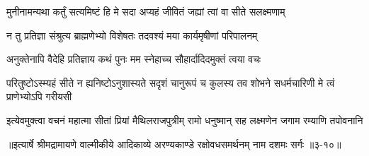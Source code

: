 \twolineshloka
{मुनीनामन्यथा कर्तुं सत्यमिष्टं हि मे सदा}
{अप्यहं जीवितं जह्यां त्वां वा सीते सलक्ष्मणाम्} %

\twolineshloka
{न तु प्रतिज्ञा संश्रुत्य ब्राह्मणेभ्यो विशेषतः}
{तदवश्यं मया कार्यमृषीणां परिपालनम्} %

\twolineshloka
{अनुक्तेनापि वैदेहि प्रतिज्ञाय कथं पुनः}
{मम स्नेहाच्च सौहार्दादिदमुक्तं त्वया वचः} %

\threelineshloka
{परितुष्टोऽस्म्यहं सीते न ह्यनिष्टोऽनुशास्यते}
{सदृशं चानुरूपं च कुलस्य तव शोभने}
{सधर्मचारिणी मे त्वं प्राणेभ्योऽपि गरीयसी} %

\twolineshloka
{इत्येवमुक्त्वा वचनं महात्मा सीतां प्रियां मैथिलराजपुत्रीम्}
{रामो धनुष्मान् सह लक्ष्मणेन जगाम रम्याणि तपोवनानि} %


॥इत्यार्षे श्रीमद्रामायणे वाल्मीकीये आदिकाव्ये अरण्यकाण्डे रक्षोवधसमर्थनम् नाम दशमः सर्गः ॥३-१०॥
